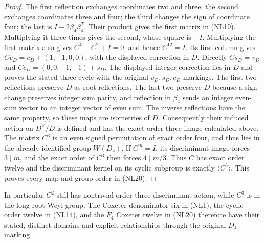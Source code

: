 \begin{proof}
The first reflection exchanges coordinates two and three; the
second exchanges coordinates three and four; the third changes
the sign of coordinate four; the last is
$I-2\beta_4\beta_4^T$. Their product gives the first matrix in
(NL19). Multiplying it three times gives the second, whose
square is $-I$. Multiplying the first matrix also gives
$C^4-C^2+I=0$, and hence $C^{12}=I$.
Its first column gives
$Cv_D=c_D+(1,-1,0,0)$, with the displayed correction in $D$.
Directly $Cs_D=v_D$ and $Cc_D=(0,0,-1,-1)+s_D$.
The displayed integer correction lies in $D$ and proves the
stated three-cycle with the original $v_D,s_D,c_D$ markings.
The first two reflections preserve $D$ as root reflections.
The last two preserve $D$ because a sign change preserves
integer sum parity, and reflection in $\beta_4$ sends an
integer even-sum vector to an integer vector of even sum.
The inverse reflections have the same property, so these
maps are isometries of $D$.
Consequently their induced action on $D^\vee/D$ is defined
and has the exact order-three image calculated above.
The matrix $C^3$ is an even signed permutation of exact order
four, and thus lies in the already identified group $W(D_4)$.
If $C^m=I$, its discriminant image forces $3\mid m$,
and the exact order of $C^3$ then forces $4\mid m/3$.
Thus $C$ has exact order twelve and the discriminant kernel
on its cyclic subgroup is exactly $\langle C^3\rangle$.
This proves every map and group order in (NL20).
\end{proof}

In particular $C^2$ still has nontrivial order-three
discriminant action, while $C^3$ is in the long-root Weyl
group. The Coxeter denominator six in (NL1), the cyclic order
twelve in (NL14), and the $F_4$ Coxeter twelve in (NL20)
therefore have their stated, distinct domains and explicit
relationships through the original $D_4$ marking.
